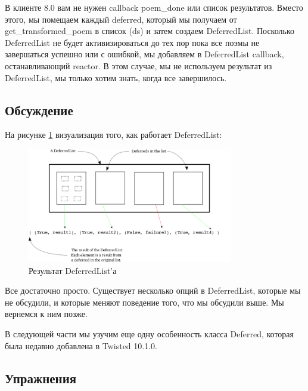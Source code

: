 В клиенте 8.0 вам не нужен callback poem\_done или 
список результатов. Вместо этого, мы помещаем каждый 
deferred, который мы получаем от get\_transformed\_poem 
в список (ds) и затем создаем DeferredList. Посколько 
DeferredList не будет активизироваться до тех пор пока все 
поэмы не завершаться успешно или с ошибкой, мы добавляем 
в DeferredList callback, останавливающий reactor. В этом 
случае, мы не используем результат из DeferredList, мы только 
хотим знать, когда все завершилось.

\subsection{Обсуждение}

На рисунке \ref{fig:deferred-list} визуализация того, 
как работает DeferredList: 

\begin{figure}[h]
\begin{center}
    \includegraphics[width=0.8\textwidth]{images/deferred-list.pdf}
    \caption{Результат DeferredList'а\label{fig:deferred-list}}
\end{center}
\end{figure}


Все достаточно просто. Существует несколько опций в DeferredList, 
которые мы не обсудили, и которые меняют поведение того, что 
мы обсудили выше. Мы вернемся к ним позже.


В следующей части мы узучим еще одну особенность класса 
Deferred, которая была недавно добавлена в Twisted 10.1.0.


\subsection{Упражнения}

